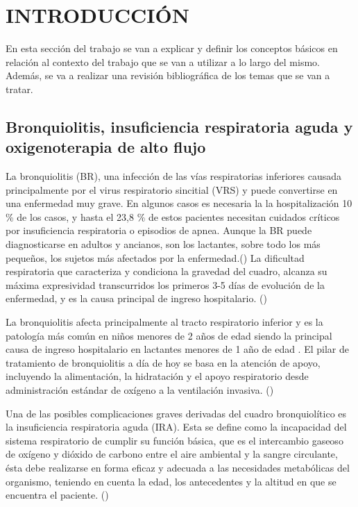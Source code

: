 \section{INTRODUCCIÓN}\label{sec:introduction}

En esta sección del trabajo se van a explicar y definir los conceptos básicos en relación al contexto del trabajo que se van a utilizar a lo largo del mismo. Además, se va a realizar una revisión bibliográfica de los temas que se van a tratar.

\subsection{Bronquiolitis, insuficiencia respiratoria aguda y oxigenoterapia de alto flujo}

La bronquiolitis (BR), una infección de las vías respiratorias inferiores causada principalmente por el virus respiratorio sincitial (VRS) y puede convertirse en una enfermedad muy grave. En algunos casos es necesaria la la hospitalización 10 \% de los casos, y hasta el 23,8 \% de estos pacientes necesitan cuidados críticos por insuficiencia respiratoria o episodios de apnea. Aunque la BR puede diagnosticarse en adultos y ancianos, son los lactantes, sobre todo los más pequeños, los sujetos más afectados por la enfermedad.(\cite{Fainardi2021}) La dificultad respiratoria que caracteriza y condiciona la gravedad del cuadro, alcanza su máxima expresividad transcurridos los primeros 3-5 días de evolución de la enfermedad, y es la causa principal de ingreso hospitalario. (\cite{Patel2003})

La bronquiolitis afecta principalmente al tracto respiratorio inferior y es la patología más común en niños menores de 2 años de edad siendo la principal causa de ingreso hospitalario en lactantes menores de 1 año de edad . El pilar de tratamiento de bronquiolitis a día de hoy se basa en la atención de apoyo, incluyendo la alimentación, la hidratación y el apoyo respiratorio desde administración estándar de oxígeno a la ventilación invasiva. (\cite{Daverio2019})

Una de las posibles complicaciones graves derivadas del cuadro bronquiolítico es la insuficiencia respiratoria aguda (IRA). Esta se define como la incapacidad del sistema respiratorio de cumplir su función básica, que es el intercambio gaseoso de oxígeno y dióxido de carbono entre el aire ambiental y la sangre circulante, ésta debe realizarse en forma eficaz y adecuada a las necesidades metabólicas del organismo, teniendo en cuenta la edad, los antecedentes y la altitud en que se encuentra el paciente. (\cite{FernandoR2010})  

